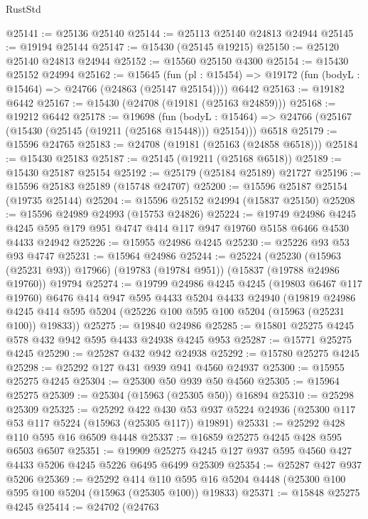 \begin{lexlean}{RustStd}
\begin{coremodule}
{\begin{coremodule}
{{{{{{{{{{{{{{{{{{{{{{{{{{{{{{{{{{{{{{{{{{{{{{{{{{{{{{{{{{{{@25141 := @25136 @25140
@25144 := @25113 @25140 @24813 @24944
@25145 := @19194 @25144
@25147 := @15430 (@25145 @19215)
@25150 := @25120 @25140 @24813 @24944
@25152 := @15560 @25150 @4300
@25154 := @15430 @25152 @24994
@25162 := @15645
    (fun (pl : @15454) => @19172 (fun (bodyL : @15464) => @24766 (@24863 (@25147 @25154))))
    @6442
@25163 := @19182 @6442
@25167 := @15430 (@24708 (@19181 (@25163 @24859)))
@25168 := @19212 @6442
@25178 := @19698
    (fun (bodyL : @15464) => @24766 (@25167 (@15430 (@25145 (@19211 (@25168 @15448))) @25154)))
    @6518
@25179 := @15596 @24765
@25183 := @24708 (@19181 (@25163 (@24858 @6518)))
@25184 := @15430 @25183
@25187 := @25145 (@19211 (@25168 @6518))
@25189 := @15430 @25187 @25154
@25192 := @25179 (@25184 @25189) @21727
@25196 := @15596 @25183 @25189 (@15748 @24707)
@25200 := @15596 @25187 @25154 (@19735 @25144)
@25204 := @15596 @25152 @24994 (@15837 @25150)
@25208 := @15596 @24989 @24993 (@15753 @24826)
@25224 := @19749
    @24986
    @4245
    @4245
    @595
    @179
    @951
    @4747
    @414
    @117
    @947
    @19760
    @5158
    @6466
    @4530
    @4433
    @24942
@25226 := @15955 @24986 @4245
@25230 := @25226 @93 @53 @93 @4747
@25231 := @15964 @24986
@25244 := @25224
    (@25230 (@15963 (@25231 @93)) @17966)
    (@19783 (@19784 @951))
    (@15837 (@19788 @24986 @19760))
    @19794
@25274 := @19799
    @24986
    @4245
    @4245
    (@19803 @6467 @117 @19760)
    @6476
    @414
    @947
    @595
    @4433
    @5204
    @4433
    @24940
    (@19819
      @24986
      @4245
      @414
      @595
      @5204
      (@25226 @100 @595 @100 @5204 (@15963 (@25231 @100)) @19833))
@25275 := @19840 @24986
@25285 := @15801 @25275 @4245 @578 @432 @942 @595 @4433 @24938 @4245 @953
@25287 := @15771 @25275 @4245
@25290 := @25287 @432 @942 @24938
@25292 := @15780 @25275 @4245
@25298 := @25292 @127 @431 @939 @941 @4560 @24937
@25300 := @15955 @25275 @4245
@25304 := @25300 @50 @939 @50 @4560
@25305 := @15964 @25275
@25309 := @25304 (@15963 (@25305 @50)) @16894
@25310 := @25298 @25309
@25325 := @25292
    @422
    @430
    @53
    @937
    @5224
    @24936
    (@25300 @117 @53 @117 @5224 (@15963 (@25305 @117)) @19891)
@25331 := @25292 @428 @110 @595 @16 @6509 @4448
@25337 := @16859 @25275 @4245 @428 @595 @6503 @6507
@25351 := @19909 @25275 @4245 @127 @937 @595 @4560 @427 @4433 @5206 @4245 @5226 @6495 @6499 @25309
@25354 := @25287 @427 @937 @5206
@25369 := @25292
    @414
    @110
    @595
    @16
    @5204
    @4448
    (@25300 @100 @595 @100 @5204 (@15963 (@25305 @100)) @19833)
@25371 := @15848 @25275 @4245
@25414 := @24702
    (@24763
}}}}}}}}}}}}}}}}}}}}}}}}}}}}}}}}}}}}}}}}}}}}}}}}}}}}}}}}}}}}
\end{coremodule}}
\end{coremodule}
\end{lexlean}
